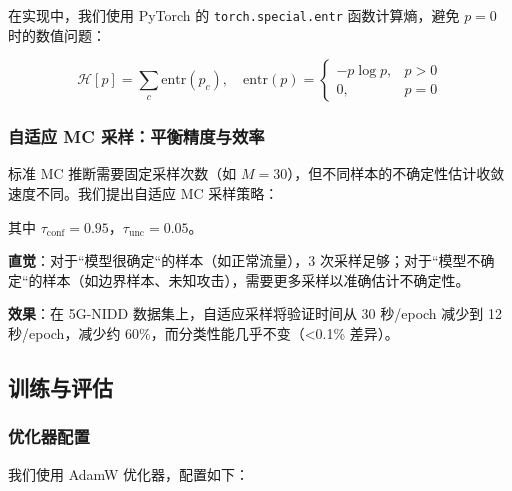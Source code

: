 在实现中，我们使用 PyTorch 的 \texttt{torch.special.entr} 函数计算熵，避免 $p=0$ 时的数值问题：

\begin{equation}
\mathcal{H}[p] = \sum_c \text{entr}(p_c), \quad \text{entr}(p) = \begin{cases}
-p \log p, & p > 0 \\
0, & p = 0
\end{cases}
\end{equation}

\subsubsection{自适应 MC 采样：平衡精度与效率}

标准 MC 推断需要固定采样次数（如 $M=30$），但不同样本的不确定性估计收敛速度不同。我们提出自适应 MC 采样策略：


其中 $\tau_{\text{conf}}=0.95$，$\tau_{\text{unc}}=0.05$。

\textbf{直觉}：对于``模型很确定``的样本（如正常流量），3 次采样足够；对于``模型不确定``的样本（如边界样本、未知攻击），需要更多采样以准确估计不确定性。

\textbf{效果}：在 5G-NIDD 数据集上，自适应采样将验证时间从 30 秒/epoch 减少到 12 秒/epoch，减少约 60\%，而分类性能几乎不变（<0.1\% 差异）。

\subsection{训练与评估}

\subsubsection{优化器配置}

我们使用 AdamW 优化器，配置如下：

